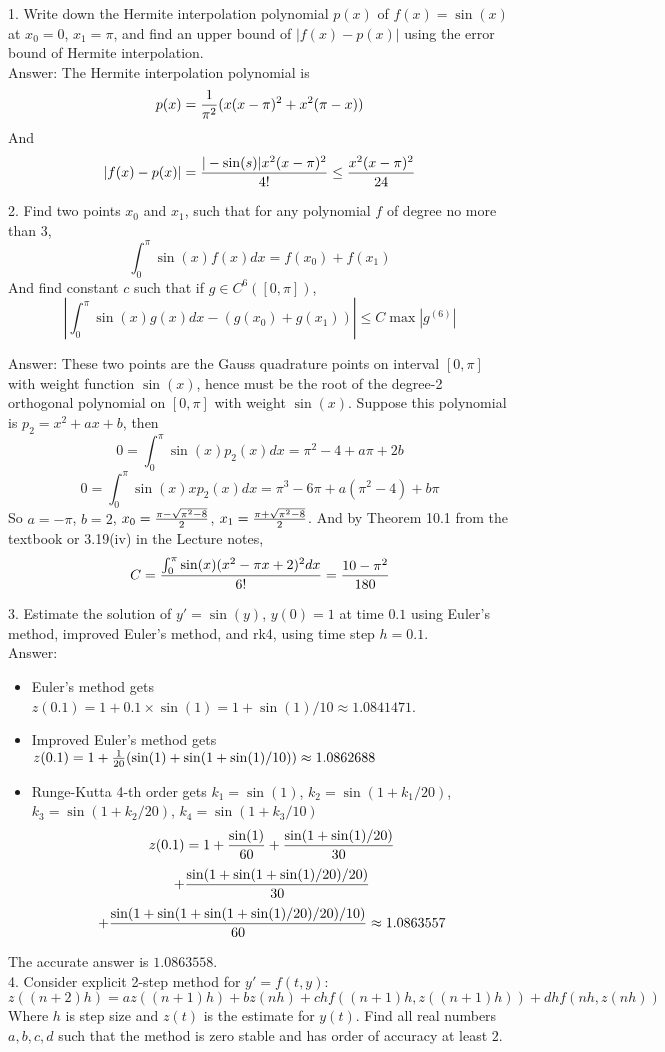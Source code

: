 \documentclass{article} %
\theoremstyle{break}
\begin{document}
1. Write down the Hermite interpolation polynomial $p(x)$ of $f(x)=\sin(x)$ at $x_0=0$, $x_1=\pi$, and find an upper bound of $|f(x)-p(x)|$ using the error bound of Hermite interpolation.\\

Answer: The Hermite interpolation polynomial is
\[p(x)={1\over \pi^2}(x(x-\pi)^2+x^2(\pi-x))\]
And
\[|f(x)-p(x)|={|-\sin(s)|x^2(x-\pi)^2\over 4!}\leq{x^2(x-\pi)^2\over 24}\]

2. Find two points $x_0$ and $x_1$, such that for any polynomial $f$ of degree no more than $3$,
\[\int_0^\pi\sin(x)f(x)dx=f(x_0)+f(x_1)\]
And find constant $c$ such that if $g\in C^6([0, \pi])$,
\[|\int_0^\pi\sin(x)g(x)dx-(g(x_0)+g(x_1))|\leq C\max|g^{(6)}|\]

Answer: These two points are the Gauss quadrature points on interval $[0, \pi]$ with weight function $\sin(x)$, hence must be the root of the degree-2 orthogonal polynomial on $[0, \pi]$ with weight $\sin(x)$. Suppose this polynomial is $p_2=x^2+ax+b$, then
\[0=\int_0^\pi \sin(x)p_2(x)dx=\pi^2-4+a\pi+2b\]
\[0=\int_0^\pi \sin(x)xp_2(x)dx=\pi^3-6\pi+a(\pi^2-4)+b\pi\]
So $a=-\pi$, $b=2$, $x_0={\pi-\sqrt{\pi^2-8}\over 2}$, $x_1={\pi+\sqrt{\pi^2-8}\over 2}$.
And by Theorem 10.1 from the textbook or 3.19(iv) in the Lecture notes,
\[C={\int_0^\pi\sin(x)(x^2-\pi x+2)^2dx\over 6!}={10-\pi^2\over 180}\]

3. Estimate the solution of $y'=\sin(y)$, $y(0)=1$ at time $0.1$ using Euler's method, improved Euler's method, and rk4, using time step $h=0.1$. \\

Answer:
\begin{itemize}
\item Euler's method gets $z(0.1)=1+0.1\times\sin(1)=1+\sin(1)/10\approx 1.0841471$.
\item Improved Euler's method gets $z(0.1)=1+{1\over 20}(\sin(1)+\sin(1+\sin(1)/10))\approx 1.0862688$
\item Runge-Kutta 4-th order gets $k_1=\sin(1)$, $k_2=\sin(1+k_1/20)$, $k_3=\sin(1+k_2/20)$, $k_4=\sin(1+k_3/10)$
  \[z(0.1)=1+{\sin(1)\over 60}+{\sin(1+\sin(1)/20)\over 30}\]
  \[+{\sin(1+\sin(1+\sin(1)/20)/20)\over 30}\]
  \[+{\sin(1+\sin(1+\sin(1+\sin(1)/20)/20)/10)\over 60}\approx 1.0863557\]
\end{itemize}
The accurate answer is $1.0863558$.\\


4. Consider explicit 2-step method for $y'=f(t, y)$:
\[z((n+2)h)=az((n+1)h)+bz(nh)+chf((n+1)h, z((n+1)h))+dhf(nh, z(nh))\]
Where $h$ is step size and $z(t)$ is the estimate for $y(t)$. Find all real numbers $a, b, c, d$ such that the method is zero stable and has order of accuracy at least $2$.
\end{document}
